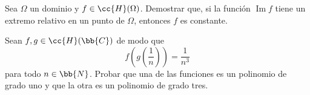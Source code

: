 \documentclass[12pt]{article}
\renewcommand{\Im}{\operatorname{Im}}
\begin{document}
    \begin{ejercicio}[2.5 puntos]
        Sea $\Omega$ un dominio y $f \in \cc{H}(\Omega)$. Demostrar que, si la función $\Im f$ tiene un extremo relativo en un punto de $\Omega$, entonces $f$ es constante.
    \end{ejercicio}

    \begin{ejercicio}[2.5 puntos]
        Sean $f, g \in \cc{H}(\bb{C})$ de modo que
        $$f\left(g\left(\frac{1}{n}\right)\right) = \frac{1}{n^3}$$
        para todo $n \in \bb{N}$.
        Probar que una de las funciones es un polinomio de grado uno y que la otra es un polinomio de grado tres.
    \end{ejercicio}

    \newpage
    \setcounter{ejercicio}{0} %
    
\end{document}

